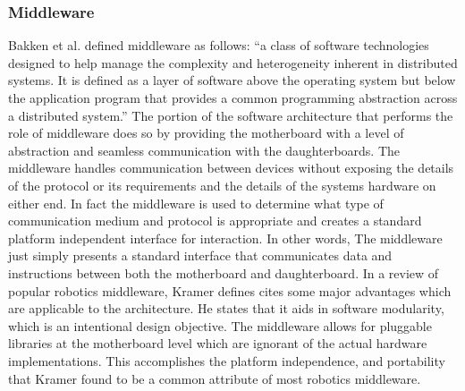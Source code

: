	\subsubsection{Middleware} %
	\label{ssub:middleware}
	Bakken et al. \cite{bakken2001middleware} defined middleware as follows: ``a class of software technologies designed to help manage the complexity and heterogeneity inherent in distributed systems. It is defined as a layer of software above the operating system but below the application program that provides a common programming abstraction across a distributed system.'' The portion of the \xten software architecture that performs the role of middleware does so by providing the motherboard with a level of abstraction and seamless communication with the daughterboards. The middleware handles communication between devices without exposing the details of the protocol or its requirements and the details of the systems hardware on either end. In fact the middleware is used to determine what type of communication medium and protocol is appropriate and creates a standard platform independent interface for interaction. In other words, The middleware just simply presents a standard interface that communicates data and instructions between both the motherboard and daughterboard.
	In a review of popular robotics middleware, Kramer \cite{Kramer2006} defines cites some major advantages which are applicable to the \xten architecture. He states that it aids in software modularity, which is an intentional design objective. The middleware allows for pluggable libraries at the motherboard level which are ignorant of the actual hardware implementations. This accomplishes the platform independence, and portability that Kramer found to be a common attribute of most robotics middleware.
	
